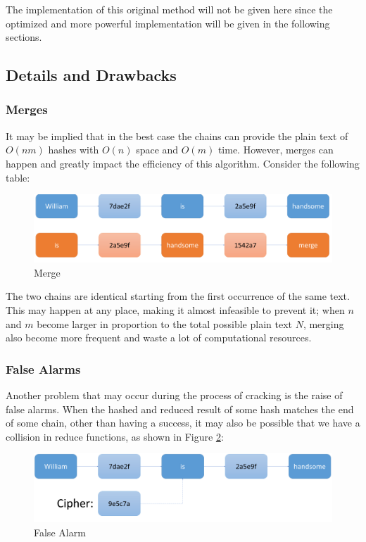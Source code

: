 \documentclass{article}
\begin{document}
\begin{multicols}{2}
The implementation of this original method will not be given here since the optimized and more powerful implementation will be given in the following sections.

\subsection{Details and Drawbacks}
\subsubsection{Merges}
It may be implied that in the best case the chains can provide the plain text of $O(nm)$ hashes with $O(n)$ space and $O(m)$ time. However, merges can happen and greatly impact the efficiency of this algorithm. Consider the following table:

\begin{figure}[H]
	\centering
	\includegraphics[width=\linewidth]{img/hashmerge}
	\caption{Merge}
	\label{fig:hashmerge}
\end{figure}

The two chains are identical starting from the first occurrence of the same text. This may happen at any place, making it almost infeasible to prevent it; when $n$ and $m$ become larger in proportion to the total possible plain text $N$, merging also become more frequent and waste a lot of computational resources.

\subsubsection{False Alarms}
Another problem that may occur during the process of cracking is the raise of false alarms. When the hashed and reduced result of some hash matches the end of some chain, other than having a success, it may also be possible that we have a collision in reduce functions, as shown in Figure \ref{fig:hashfalsealarm}:
\begin{figure}[H]
	\centering
	\includegraphics[width=\linewidth]{img/hashFalseAlarm}
	\caption{False Alarm}
	\label{fig:hashfalsealarm}
\end{figure}




\end{multicols}
\end{document}
